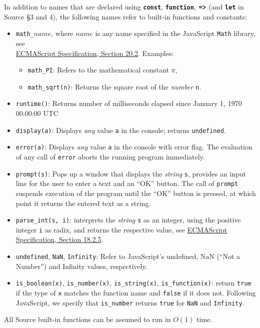 In addition to names that
are declared using \texttt{\textbf{const}}, \texttt{\textbf{function}},
$\texttt{\textbf{=>}}$ (and \texttt{\textbf{let}} in Source \S3 and 4), the following
names refer to built-in functions and constants:
\begin{itemize}
\item \lstinline{math_}$\textit{name}$,
where $\textit{name}$ is any name specified in the
JavaScript
\texttt{Math} library, see\\
\href{https://www.ecma-international.org/ecma-262/8.0/index.html#sec-math-object}{\color{DarkBlue}ECMAScript Specification, Section 20.2}. Examples:
\begin{itemize}
\item \verb#math_PI#: Refers to the mathematical constant $\pi$,
\item \verb#math_sqrt#\texttt{(n)}: Returns the square root of the \emph{number} \texttt{n}.
\end{itemize}
\item \texttt{runtime()}: Returns number of milliseconds elapsed since January 1, 1970 00:00:00 UTC
\item \texttt{display(a)}: Displays \emph{any} value \texttt{a} in the console; returns \texttt{undefined}.
\item \texttt{error(a)}: Displays \emph{any} value \texttt{a} in the console with error flag. The evaluation
  of any call of \texttt{error} aborts the running program immediately.
\item \texttt{prompt(s)}: Pops up a window that displays the \emph{string} \texttt{s}, provides
an input line for the user to enter a text and an ``OK'' button. The call of \texttt{prompt}
suspends execution of the program until the ``OK'' button is pressed, at which point it
returns the entered text as a string.
\item \verb#parse_int#\texttt{(s, i)}:
interprets the \emph{string} \texttt{s} as an integer, using the positive integer \texttt{i} as radix, and returns the respective value,
see \href{https://www.ecma-international.org/ecma-262/8.0/index.html#sec-parseint-string-radix}{\color{DarkBlue}ECMAScript Specification, Section 18.2.5}.
\item \verb#undefined#, \verb#NaN#, \verb#Infinity#: Refer to JavaScript's undefined,
NaN (``Not a Number'') and Infinity values, respectively.
\item \verb#is_boolean#\texttt{(x)}, \verb#is_number#\texttt{(x)}, \verb#is_string#\texttt{(x)}, \verb#is_function#\texttt{(x)}:
        return \texttt{true} if the type of \texttt{x} matches the function name and \texttt{false} if it does not. Following
  JavaScript, we specify that \verb#is_number# returns \texttt{true} for \texttt{NaN} and \texttt{Infinity}.
\end{itemize}
All Source built-in functions can be assumed to run in $O(1)$ time.
